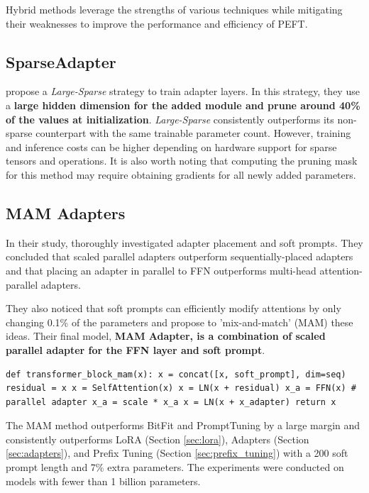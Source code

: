 Hybrid methods leverage the strengths of various techniques while mitigating their weaknesses to improve the performance and efficiency of PEFT.

\subsection{SparseAdapter}
\label{sec:sparse_adapter}

\citet{sparse_adapter} propose a \textit{Large-Sparse} strategy to train adapter layers. In this strategy, they use a \textbf{large hidden dimension for the added module and prune around 40\% of the values at initialization}. \textit{Large-Sparse} consistently outperforms its non-sparse counterpart with the same trainable parameter count. However, training and inference costs can be higher depending on hardware support for sparse tensors and operations. It is also worth noting that computing the pruning mask for this method may require obtaining gradients for all newly added parameters.

\subsection{MAM Adapters}
\label{sec:mam_adapter}

In their study, \citet{parallel_adapter} thoroughly investigated adapter placement and soft prompts. They concluded that scaled parallel adapters outperform sequentially-placed adapters and that placing an adapter in parallel to FFN outperforms multi-head attention-parallel adapters.

They also noticed that soft prompts can efficiently modify attentions by only changing 0.1\% of the parameters and propose to 'mix-and-match' (MAM) these ideas. Their final model, \textbf{MAM Adapter, is a combination of scaled parallel adapter for the FFN layer and soft prompt}.

\begin{lstlisting}
def transformer_block_mam(x): x = concat([x, soft_prompt], dim=seq) residual = x x = SelfAttention(x) x = LN(x + residual) x_a = FFN(x) # parallel adapter x_a = scale * x_a x = LN(x + x_adapter) return x
\end{lstlisting}

The MAM method outperforms BitFit and PromptTuning by a large margin and consistently outperforms LoRA (Section \ref{sec:lora}), Adapters (Section \ref{sec:adapters}), and Prefix Tuning (Section \ref{sec:prefix_tuning}) with a 200 soft prompt length and 7\% extra parameters. The experiments were conducted on models with fewer than 1 billion parameters.

